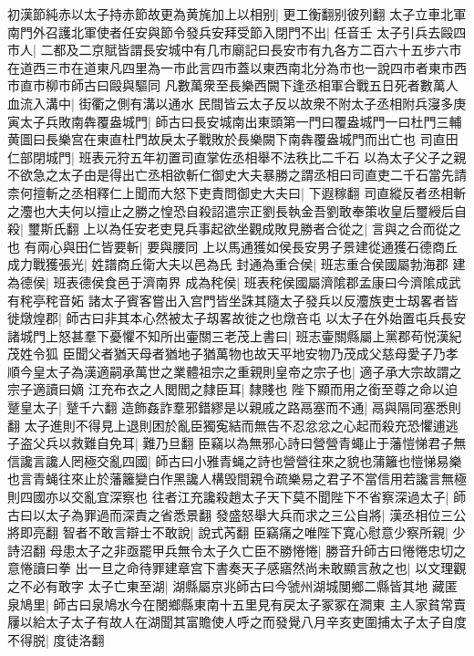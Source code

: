 初漢節純赤以太子持赤節故更為黄旄加上以相别|{
	更工衡翻别彼列翻}
太子立車北軍南門外召護北軍使者任安與節令發兵安拜受節入閉門不出|{
	任音壬}
太子引兵去毆四市人|{
	二都及二京賦皆謂長安城中有几市廟記曰長安市有九各方二百六十五步六市在道西三市在道東凡四里為一市此言四市蓋以東西南北分為市也一說四市者東市西市直市柳市師古曰毆與驅同}
凡數萬衆至長樂西闕下逢丞相軍合戰五日死者數萬人血流入溝中|{
	街衢之側有溝以通水}
民間皆云太子反以故衆不附太子丞相附兵寖多庚寅太子兵敗南犇覆盎城門|{
	師古曰長安城南出東頭第一門曰覆盎城門一曰杜門三輔黄圖曰長樂宫在東直杜門故戾太子戰敗於長樂闕下南犇覆盎城門而出亡也}
司直田仁部閉城門|{
	班表元狩五年初置司直掌佐丞相舉不法秩比二千石}
以為太子父子之親不欲急之太子由是得出亡丞相欲斬仁御史大夫暴勝之謂丞相曰司直吏二千石當先請柰何擅斬之丞相釋仁上聞而大怒下吏責問御史大夫曰|{
	下遐稼翻}
司直縱反者丞相斬之灋也大夫何以擅止之勝之惶恐自殺詔遣宗正劉長執金吾劉敢奉策收皇后璽綬后自殺|{
	璽斯氏翻}
上以為任安老吏見兵事起欲坐觀成敗見勝者合從之|{
	言與之合而從之也}
有兩心與田仁皆要斬|{
	要與腰同}
上以馬通獲如侯長安男子景建從通獲石德商丘成力戰獲張光|{
	姓譜商丘衛大夫以邑為氏}
封通為重合侯|{
	班志重合侯國屬勃海郡}
建為德侯|{
	班表德侯食邑于濟南界}
成為秺侯|{
	班表秺侯國屬濟隂郡孟康曰今濟隂成武有秺亭秺音妬}
諸太子賓客嘗出入宫門皆坐誅其隨太子發兵以反灋族吏士刼畧者皆徙燉煌郡|{
	師古曰非其本心然被太子刼畧故徙之也燉咅屯}
以太子在外始置屯兵長安諸城門上怒甚羣下憂懼不知所出壷關三老茂上書曰|{
	班志壷關縣屬上黨郡苟悦漢紀茂姓令狐}
臣聞父者猶天母者猶地子猶萬物也故天平地安物乃茂成父慈母愛子乃孝順今皇太子為漢適嗣承萬世之業體祖宗之重親則皇帝之宗子也|{
	適子承大宗故謂之宗子適讀曰嫡}
江充布衣之人閭閻之隸臣耳|{
	隸賤也}
陛下顯而用之銜至尊之命以迫蹵皇太子|{
	蹵千六翻}
造飾姦詐羣邪錯繆是以親戚之路鬲塞而不通|{
	鬲與隔同塞悉則翻}
太子進則不得見上退則困於亂臣獨寃結而無告不忍忿忿之心起而殺充恐懼逋逃子盗父兵以救難自免耳|{
	難乃旦翻}
臣竊以為無邪心詩曰營營青蠅止于藩愷悌君子無信讒言讒人罔極交亂四國|{
	師古曰小雅青蝇之詩也營營往來之貌也蒲籬也愷悌易樂也言青蝇往來止於藩籬變白作黑讒人構毁間親令疏樂易之君子不當信用若讒言無極則四國亦以交亂宜深察也}
往者江充讒殺趙太子天下莫不聞陛下不省察深過太子|{
	師古曰以太子為罪過而深責之省悉景翻}
發盛怒舉大兵而求之三公自將|{
	漢丞相位三公將即亮翻}
智者不敢言辯士不敢說|{
	說式芮翻}
臣竊痛之唯陛下寛心慰意少察所親|{
	少詩沼翻}
母患太子之非亟罷甲兵無令太子久亡臣不勝惓惓|{
	勝音升師古曰惓惓忠切之意惓讀曰拳}
出一旦之命待罪建章宫下書奏天子感寤然尚未敢顯言赦之也|{
	以文理觀之不必有敢字}
太子亡東至湖|{
	湖縣屬京兆師古曰今虢州湖城閺鄉二縣皆其地}
藏匿泉鳩里|{
	師古曰泉鳩水今在閿鄉縣東南十五里見有戻太子冢冢在澗東}
主人家貧常賣屨以給太子太子有故人在湖聞其富贍使人呼之而發覺八月辛亥吏圍捕太子太子自度不得脱|{
	度徒洛翻}
